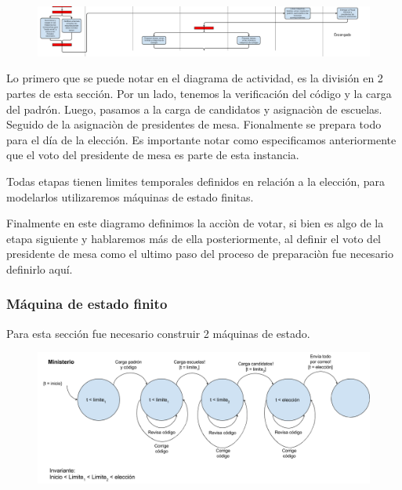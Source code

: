 \begin{figure}[h!]
\centering
\includegraphics[scale=0.5]{imagenes/actividad/actividadPreparacion3}
\end{figure}


Lo primero que se puede notar en el diagrama de actividad, es la división en 2 partes de esta sección. Por un lado, tenemos la verificación del código y la carga del padrón. Luego, pasamos a la carga de candidatos y asignaciòn de escuelas. Seguido de la asignaciòn de presidentes de mesa. Fionalmente se prepara todo para el día de la elección. Es importante notar como especificamos anteriormente que el voto del presidente de mesa es parte de esta instancia. 

Todas etapas tienen limites temporales definidos en relación a la elección, para modelarlos utilizaremos máquinas de estado finitas.

Finalmente en este diagramo definimos la acciòn de votar, si bien es algo de la etapa siguiente y hablaremos más de ella posteriormente, al definir el voto del presidente de mesa como el ultimo paso del proceso de preparaciòn fue necesario definirlo aquí.


\subsubsection{Máquina de estado finito}

Para esta sección fue necesario construir 2 máquinas de estado.

\begin{figure}[h!]
\centering
\includegraphics[scale=0.45]{imagenes/FSMs/Preparacion/Fechaslimite1}
\end{figure}

